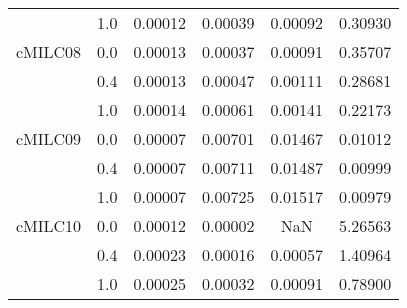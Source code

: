 \begin{longtable}{cccccc}
     & 1.0 & 0.00012 & 0.00039 & 0.00092 & 0.30930 \\
cMILC08 & 0.0 & 0.00013 & 0.00037 & 0.00091 & 0.35707 \\
     & 0.4 & 0.00013 & 0.00047 & 0.00111 & 0.28681 \\
     & 1.0 & 0.00014 & 0.00061 & 0.00141 & 0.22173 \\
cMILC09 & 0.0 & 0.00007 & 0.00701 & 0.01467 & 0.01012 \\
     & 0.4 & 0.00007 & 0.00711 & 0.01487 & 0.00999 \\
     & 1.0 & 0.00007 & 0.00725 & 0.01517 & 0.00979 \\
cMILC10 & 0.0 & 0.00012 & 0.00002 & NaN & 5.26563 \\
     & 0.4 & 0.00023 & 0.00016 & 0.00057 & 1.40964 \\
     & 1.0 & 0.00025 & 0.00032 & 0.00091 & 0.78900 \\
\end{longtable}
